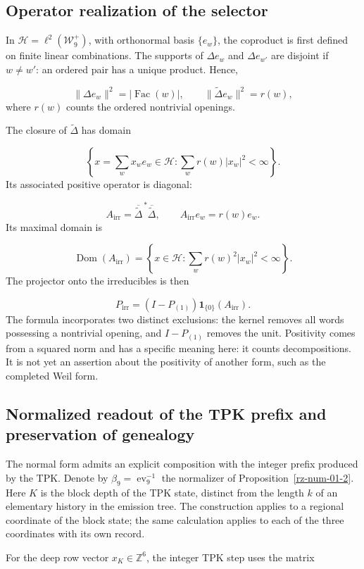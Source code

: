 \subsection{Operator realization of the selector}
In \(\mathcal H=\ell^2(\mathcal W_9^+)\), with orthonormal basis \(\{e_w\}\), the coproduct is first defined on finite linear combinations. The supports of $\Delta e_w$ and $\Delta e_{w'}$ are disjoint if $w\ne w'$: an ordered pair has a unique product. Hence,

\[
\|\Delta e_w\|^2=|\operatorname{Fac}(w)|,
\qquad
\|\widetilde\Delta e_w\|^2=r(w),
\]
where $r(w)$ counts the ordered nontrivial openings.

The closure of $\widetilde\Delta$ has domain

\[
\left\{x=\sum_wx_we_w\in\mathcal H:\sum_wr(w)|x_w|^2<\infty\right\}.
\]
Its associated positive operator is diagonal:

\[
A_{\mathrm{irr}}=\overline{\widetilde\Delta}^{\,*}\overline{\widetilde\Delta},
\qquad A_{\mathrm{irr}}e_w=r(w)e_w.
\]
Its maximal domain is

\[
\operatorname{Dom}(A_{\mathrm{irr}})
=\left\{x\in\mathcal H:\sum_wr(w)^2|x_w|^2<\infty\right\}.
\]
The projector onto the irreducibles is then

\[
P_{\mathrm{irr}}=(I-P_{(1)})\mathbf1_{\{0\}}(A_{\mathrm{irr}}).
\]
The formula incorporates two distinct exclusions: the kernel removes all words possessing a nontrivial opening, and $I-P_{(1)}$ removes the unit. Positivity comes from a squared norm and has a specific meaning here: it counts decompositions. It is not yet an assertion about the positivity of another form, such as the completed Weil form.

\subsection{Normalized readout of the TPK prefix and preservation of genealogy}
The normal form admits an explicit composition with the integer prefix produced by the TPK. Denote by \(\beta_9=\operatorname{ev}_9^{-1}\) the normalizer of Proposition~\ref{rz-num-01-2}. Here \(K\) is the block depth of the TPK state, distinct from the length \(k\) of an elementary history in the emission tree. The construction applies to a regional coordinate of the block state; the same calculation applies to each of the three coordinates with its own record.

For the deep row vector \(x_K\in\mathbb Z^6\), the integer TPK step uses the matrix


